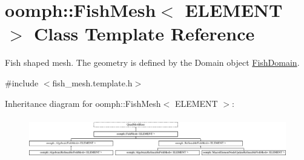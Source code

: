 \hypertarget{classoomph_1_1FishMesh}{}\section{oomph\+:\+:Fish\+Mesh$<$ E\+L\+E\+M\+E\+NT $>$ Class Template Reference}
\label{classoomph_1_1FishMesh}


Fish shaped mesh. The geometry is defined by the Domain object \hyperlink{classoomph_1_1FishDomain}{Fish\+Domain}.  




{\ttfamily \#include $<$fish\+\_\+mesh.\+template.\+h$>$}

Inheritance diagram for oomph\+:\+:Fish\+Mesh$<$ E\+L\+E\+M\+E\+NT $>$\+:\begin{figure}[H]
\begin{center}
\leavevmode
\includegraphics[height=1.821138cm]{classoomph_1_1FishMesh}
\end{center}
\end{figure}
